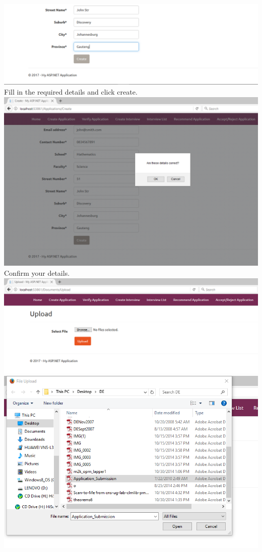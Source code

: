 \documentclass{article}
\begin{document}
\begin{center}
\includegraphics[scale=0.5]{CreateApplication4.png}\\
Fill in the required details and click create.\\ \bigskip
\includegraphics[scale=0.5]{CreateApplication5.png}\\
Confirm your details. \\ \bigskip
\includegraphics[scale=0.5]{CreateApplication6.png}\\
\includegraphics[scale=0.5]{CreateApplication7.png}\\

\end{center}
\end{document}

